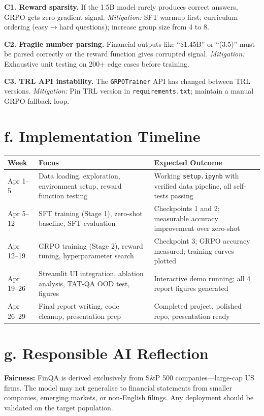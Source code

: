 \documentclass[10pt]{article}
\begin{document}
\textbf{C1. Reward sparsity.} If the 1.5B model rarely produces correct answers, GRPO gets zero gradient signal. \textit{Mitigation:} SFT warmup first; curriculum ordering (easy$\to$hard questions); increase group size from 4 to 8.

\textbf{C2. Fragile number parsing.} Financial outputs like ``\$1.45B'' or ``(3.5)'' must be parsed correctly or the reward function gives corrupted signal. \textit{Mitigation:} Exhaustive unit testing on 200+ edge cases before training.

\textbf{C3. TRL API instability.} The \texttt{GRPOTrainer} API has changed between TRL versions. \textit{Mitigation:} Pin TRL version in \texttt{requirements.txt}; maintain a manual GRPO fallback loop.

\section{f. Implementation Timeline}

\renewcommand{\arraystretch}{1.2}
\begin{tabularx}{\textwidth}{@{}p{2.5cm}p{4.5cm}X@{}}
\toprule
\textbf{Week} & \textbf{Focus} & \textbf{Expected Outcome} \\
\midrule
Apr 1--5 & Data loading, exploration, environment setup, reward function testing & Working \texttt{setup.ipynb} with verified data pipeline, all self-tests passing \\
Apr 5--12 & SFT training (Stage 1), zero-shot baseline, SFT evaluation & Checkpoints 1 and 2; measurable accuracy improvement over zero-shot \\
Apr 12--19 & GRPO training (Stage 2), reward tuning, hyperparameter search & Checkpoint 3; GRPO accuracy measured; training curves plotted \\
Apr 19--26 & Streamlit UI integration, ablation analysis, TAT-QA OOD test, figures & Interactive demo running; all 4 report figures generated \\
Apr 26--29 & Final report writing, code cleanup, presentation prep & Completed project, polished repo, presentation ready \\
\bottomrule
\end{tabularx}

\section{g. Responsible AI Reflection}

\textbf{Fairness:} FinQA is derived exclusively from S\&P 500 companies---large-cap US firms. The model may not generalise to financial statements from smaller companies, emerging markets, or non-English filings. Any deployment should be validated on the target population.
\end{document}
